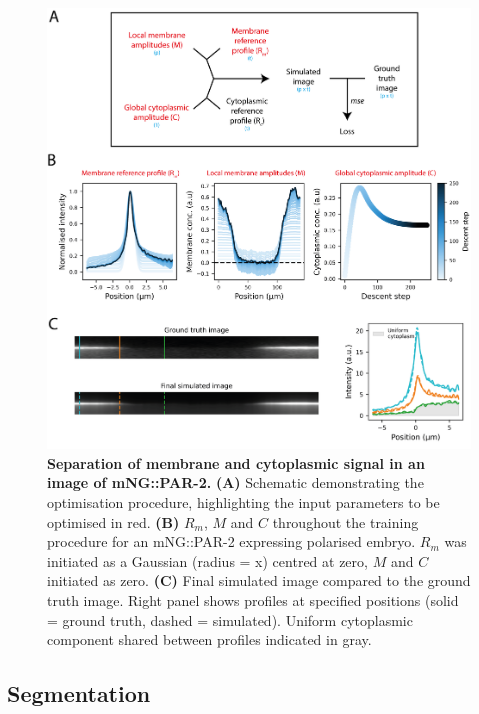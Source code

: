 \documentclass[12pt]{"report"}
\newcommand{\mycaption}[2]{\caption[#1]{\textbf{#1.} #2}}
\begin{document}
\begin{figure}
\includegraphics[scale=1]{memquant_membg_training}
\centering
\mycaption{Separation of membrane and cytoplasmic signal in an image of mNG::PAR-2}{
\textbf{(A)} Schematic demonstrating the optimisation procedure, highlighting the input parameters to be optimised in red.
\textbf{(B)} $R_m$, $M$ and $C$ throughout the training procedure for an mNG::PAR-2 expressing polarised embryo. $R_m$ was initiated as a Gaussian (radius = x) centred at zero, $M$ and $C$ initiated as zero.
\textbf{(C)} Final simulated image compared to the ground truth image. Right panel shows profiles at specified positions (solid = ground truth, dashed = simulated). Uniform cytoplasmic component shared between profiles indicated in gray.
}
\label{fig:memquant_membg_training}
\end{figure}


\subsection{Segmentation}
\end{document}
